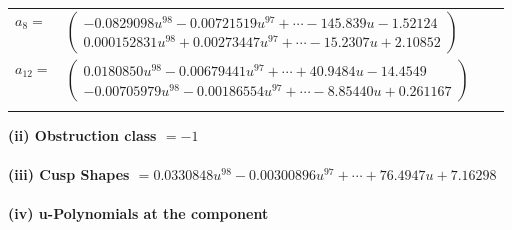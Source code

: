 \documentclass[1p]{elsarticle_modified}
\theoremstyle{definition}
\begin{document}
\begin{tabular}{m{7pt} m{180pt} m{7pt} m{180pt} }
\flushright $a_{8}=$&$\begin{pmatrix}-0.0829098 u^{98}-0.00721519 u^{97}+\cdots-145.839 u-1.52124\\0.000152831 u^{98}+0.00273447 u^{97}+\cdots-15.2307 u+2.10852\end{pmatrix}$ \\
\flushright $a_{12}=$&$\begin{pmatrix}0.0180850 u^{98}-0.00679441 u^{97}+\cdots+40.9484 u-14.4549\\-0.00705979 u^{98}-0.00186554 u^{97}+\cdots-8.85440 u+0.261167\end{pmatrix}$\\&\end{tabular}
\flushleft \textbf{(ii) Obstruction class $= -1$}\\~\\
\flushleft \textbf{(iii) Cusp Shapes $= 0.0330848 u^{98}-0.00300896 u^{97}+\cdots+76.4947 u+7.16298$}\\~\\
\newpage\renewcommand{\arraystretch}{1}
\flushleft \textbf{(iv) u-Polynomials at the component}\newline \\
\end{document}
